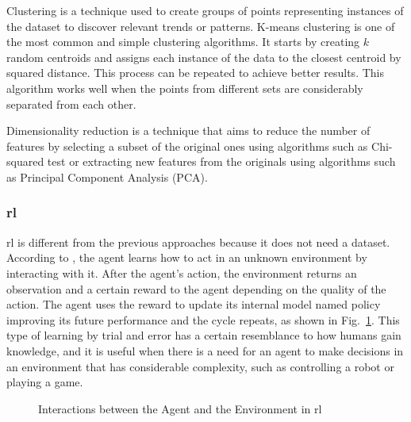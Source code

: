 Clustering is a technique used to create groups of points representing instances of the dataset to discover relevant trends or patterns. K-means clustering is one of the most common and simple clustering algorithms. It starts by creating $k$ random centroids and assigns each instance of the data to the closest centroid by squared distance. This process can be repeated to achieve better results. This algorithm works well when the points from different sets are considerably separated from each other.

Dimensionality reduction is a technique that aims to reduce the number of features by selecting a subset of the original ones using algorithms such as Chi-squared test or extracting new features from the originals using algorithms such as Principal Component Analysis (PCA).


\subsubsection{\acf{rl}}

\acl{rl} is different from the previous approaches because it does not need a dataset. According to \textcite{Alom2019}, the agent learns how to act in an unknown environment by interacting with it. After the agent's action, the environment returns an observation and a certain reward to the agent depending on the quality of the action. The agent uses the reward to update its internal model named policy improving its future performance and the cycle repeats, as shown in Fig.~\ref{rl_diagram}. This type of learning by trial and error has a certain resemblance to how humans gain knowledge, and it is useful when there is a need for an agent to make decisions in an environment that has considerable complexity, such as controlling a robot or playing a game.

\begin{figure}[h]
\centering
\caption[Interactions between the Agent and the Environment in \acs{rl}]{Interactions between the Agent and the Environment in \acs{rl} \cite{Alom2019}}
\label{rl_diagram}
\end{figure}

